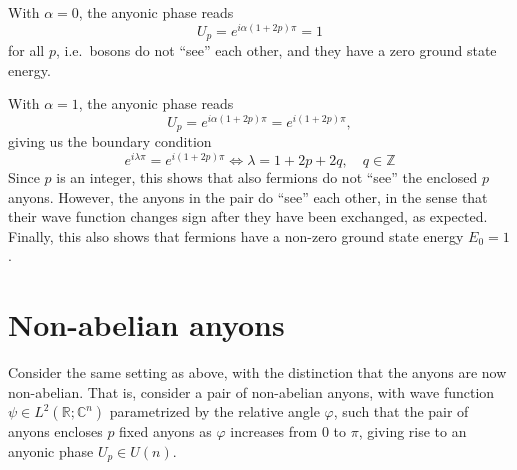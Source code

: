 \begin{corollary}
  With $α = 0$, the anyonic phase reads
  \begin{equation}
    U_p = e^{iα(1+2p)π} = 1
  \end{equation}
  for all $p$, i.e.\ bosons do not ``see'' each other, and they have a zero ground state energy.

  With $α = 1$, the anyonic phase reads
  \begin{equation}
    U_p = e^{iα(1+2p)π} = e^{i(1+2p)π},
  \end{equation}
  giving us the boundary condition
  \begin{equation}
    e^{iλ π} = e^{i(1+2p)π} \iff λ = 1 + 2p + 2q, \quad q ∈ ℤ
  \end{equation}
  Since $p$ is an integer, this shows that also fermions do not ``see'' the enclosed $p$ anyons.
  However, the anyons in the pair do ``see'' each other, in the sense that their wave function changes sign after they have been exchanged, as expected. Finally, this also shows that fermions have a non-zero ground state energy $E_0 = 1$.
\end{corollary}












\section{Non-abelian anyons}

Consider the same setting as above, with the distinction that the anyons are now non-abelian. That is, consider a pair of non-abelian anyons, with wave function $ψ ∈ L^2(ℝ; \mathbb{C}^n)$ parametrized by the relative angle $\varphi$, such that the pair of anyons encloses $p$ fixed anyons as $\varphi$ increases from $0$ to $π$, giving rise to an anyonic phase $U_p ∈ U(n)$.





